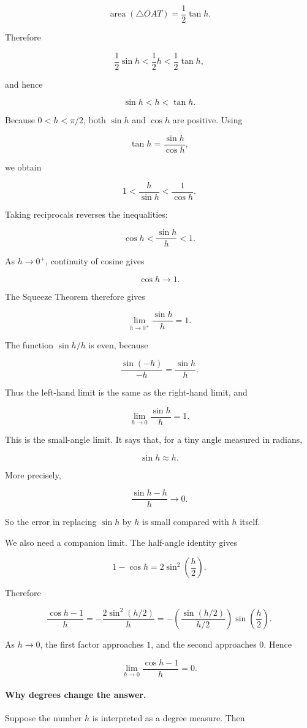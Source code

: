 \[
\operatorname{area}(\triangle OAT)=\frac12\tan h.
\]

Therefore

\[
\frac12\sin h
<
\frac12h
<
\frac12\tan h,
\]

and hence

\[
\sin h<h<\tan h.
\]

Because \(0<h<\pi/2\), both \(\sin h\) and \(\cos h\) are positive. Using

\[
\tan h=\frac{\sin h}{\cos h},
\]

we obtain

\[
1<\frac{h}{\sin h}<\frac1{\cos h}.
\]

Taking reciprocals reverses the inequalities:

\[
\cos h<\frac{\sin h}{h}<1.
\]

As \(h\to0^+\), continuity of cosine gives

\[
\cos h\to1.
\]

The Squeeze Theorem therefore gives

\[
\lim_{h\to0^+}\frac{\sin h}{h}=1.
\]

The function \(\sin h/h\) is even, because

\[
\frac{\sin(-h)}{-h}=\frac{\sin h}{h}.
\]

Thus the left-hand limit is the same as the right-hand limit, and

\[
\boxed{
\lim_{h\to0}\frac{\sin h}{h}=1.
}
\]

This is the small-angle limit. It says that, for a tiny angle measured in radians,

\[
\sin h\approx h.
\]

More precisely,

\[
\frac{\sin h-h}{h}\to0.
\]

So the error in replacing \(\sin h\) by \(h\) is small compared with \(h\) itself.

We also need a companion limit. The half-angle identity gives

\[
1-\cos h=2\sin^2\left(\frac h2\right).
\]

Therefore

\[
\frac{\cos h-1}{h}
=
-\frac{2\sin^2(h/2)}{h}
=
-\left(\frac{\sin(h/2)}{h/2}\right)
 \sin\left(\frac h2\right).
\]

As \(h\to0\), the first factor approaches \(1\), and the second approaches \(0\).
Hence

\[
\boxed{
\lim_{h\to0}\frac{\cos h-1}{h}=0.
}
\]

\paragraph{Why degrees change the answer.}
Suppose the number \(h\) is interpreted as a degree measure. Then


